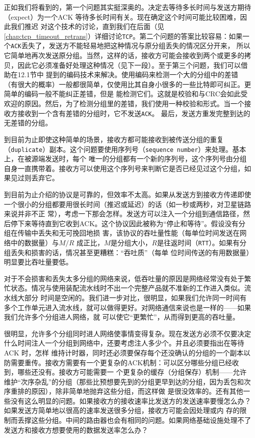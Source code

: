 正如我们将看到的，第一个问题其实挺深奥的。决定去等待多长时间与发送方期待（expect）为一个ACK 等待多长时间有关。现在确定这个时间可能比较困难，因此我们推迟
对这个技术的讨论，直到我们在后面（见\autoref{chap:tcp_timeout_retrans}）详细讨论\verb|TCP|。第二个问题的答案比较容易：如果一个\verb|ACK|丢失了，发送方不能轻易地把这种情况与原分组丢失的情况区分开来，
所以它简单地再次发送原分组。当然，这样的话，接收方可能会接收到两个或更多的拷贝，因此它必须准备好处理这种情况（见下一段）。至于第三个问题，我们可以借助在12.1节中
提到的编码技术来解决。使用编码来检测一个大的分组中的差错（有很大的概率）一般都很简单，仅使用比其自身小很多的一些比特即可纠正。更简单的编码一般不能纠正差错，但是
能检测它们。这就是校验和与CRC会如此受欢迎的原因。然后，为了检测分组里的差错，我们使用一种校验和形式。当一个接收方接收到一个含有差错的分组时，它不发送\verb|ACK|。
最后，发送方重发完整到达的无差错的分组。

到目前为止即使这种简单的场景，接收方都可能接收到被传送分组的重复（\verb|duplicate|）副本。这个问题要使用序列号（\verb|sequence number|）来处理。基本上，在被源端发送时，每个
唯一的分组都有一个新的序列号，这个序列号由分组自身一直携带着。接收方可以使用这个序列号来判断它是否已经见过这个分组，如果见过则丢弃它。

到目前为止介绍的协议是可靠的，但效率不太高。如果从发送方到接收方传递即使一个很小的分组都要用很长时间（推迟或延迟）的话（如一秒或两秒，对卫星链路来说并非不正
常），考虑一下那会怎样。发送方可以注入一个分组到通信路径，然后停下来等待直到它收到ACK。这个协议因此被称为“停止和等待”。假设没有分组在传输中丢失和无可挽回地损
害，该协议的吞吐量性能（每单位时间发送在网络中的数据量）与$M/R$ 成正比，$M$是分组大小，$R$是往返时间（\verb|RTT|）。如果有分组丢失和损害的话，情况甚至更糟糕：“吞吐质”（每单
位时间传送的有用数据量）明显要比吞吐量要低。

对于不会损害和丢失太多分组的网络来说，低吞吐量的原因是网络经常没有处于繁忙状态。情况与使用装配流水线时不出一个完整产品就不准新的工作进入类似。流水线大部分
时间是空闲的。我们进一步对比，很明显，如果我们允许同一时间有多个工作单元进入流水线，就可以做得更好。对网络通信来说也是一样的——如果我们允许多个分组进人网络，就
可以使它“更繁忙”，从而得到更高的吞吐量。

很明显，允许多个分组同时进人网络使事情变得复杂。现在发送方必须不仅要决定什么时间注人一个分组到网络中，还要考虑注人多少个。并且必须要指出在等待ACK 时，怎样
维持计时器，同时还必须要保存每个还没确认的分组的一个副本以防需要重传。接收方需要有一个更复杂的ACK机制：可以区分哪些分组已经收到，哪些还没有。接收方可能需要一
个更复杂的缓存（分组保存）机制——允许维护“次序杂乱”的分组（那些比预想要先到的分组更早到达的分组，因为丢包和次序重排的原因），除非简单地抛弃这些分组，而这样做
是很没效率的。还有其他一些没有这么明显的问题。如果接收方的接收速率比发送方的发送速率要慢怎么办？如果发送方简单地以很高的速率发送很多分组，接收方可能会因处理或内
存的限制而丢撑这些分组。中间的路由器也会有相同的问题。如果网络基础设施处理不了发送方和接收方想要使用的数据发送率怎么办？
